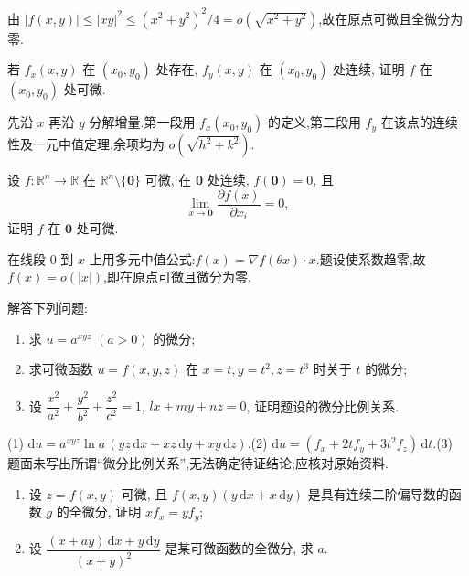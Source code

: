 \begin{solution}
    由 $|f(x,y)|\leq|xy|^2\leq(x^2+y^2)^2/4=o(\sqrt{x^2+y^2})$,故在原点可微且全微分为零.
\end{solution}

\begin{example}
    若 $f_x(x,y)$ 在 $(x_0,y_0)$ 处存在, $f_y(x,y)$ 在 $(x_0,y_0)$ 处连续, 证明 $f$ 在 $(x_0,y_0)$ 处可微.
\end{example}
\exampleblank

\begin{solution}
    先沿 $x$ 再沿 $y$ 分解增量.第一段用 $f_x(x_0,y_0)$ 的定义,第二段用 $f_y$ 在该点的连续性及一元中值定理,余项均为 $o(\sqrt{h^2+k^2})$.
\end{solution}

\begin{example}
    设 $f:\mathbb{R}^n\to\mathbb{R}$ 在 $\mathbb{R}^n\setminus\{\bm{0}\}$ 可微, 在 $\bm{0}$ 处连续, $f(\bm{0})=0$, 且
    \[
        \displaystyle\lim\limits_{x\to\bm{0}}\dfrac{\partial f(x)}{\partial x_i}=0,
    \]
    证明 $f$ 在 $\bm{0}$ 处可微.
\end{example}
\exampleblank

\begin{solution}
    在线段 $0$ 到 $x$ 上用多元中值公式:$f(x)=\nabla f(\theta x)\cdot x$.题设使系数趋零,故 $f(x)=o(|x|)$,即在原点可微且微分为零.
\end{solution}

\begin{example}
    解答下列问题:
    \begin{enumerate}
        \item 求 $u=a^{xyz}$ $(a>0)$ 的微分;
        \item 求可微函数 $u=f(x,y,z)$ 在 $x=t,y=t^2,z=t^3$ 时关于 $t$ 的微分;
        \item 设 $\dfrac{x^2}{a^2}+\dfrac{y^2}{b^2}+\dfrac{z^2}{c^2}=1$, $lx+my+nz=0$, 证明题设的微分比例关系.
    \end{enumerate}
\end{example}
\exampleblank

\begin{solution}

    (1) $\mathrm du=a^{xyz}\ln a\,(yz\,\mathrm dx+xz\,\mathrm dy+xy\,\mathrm dz)$.(2) $\mathrm du=(f_x+2tf_y+3t^2f_z)\,\mathrm dt$.(3) 题面未写出所谓``微分比例关系'',无法确定待证结论;应核对原始资料.
\end{solution}

\begin{example}
    \begin{enumerate}
        \item 设 $z=f(x,y)$ 可微, 且 $f(x,y)(y\,\mathrm{d}x+x\,\mathrm{d}y)$ 是具有连续二阶偏导数的函数 $g$ 的全微分, 证明 $xf_x=yf_y$;
        \item 设 $\displaystyle\dfrac{(x+ay)\,\mathrm{d}x+y\,\mathrm{d}y}{(x+y)^2}$ 是某可微函数的全微分, 求 $a$.
    \end{enumerate}
\end{example}
\exampleblank


